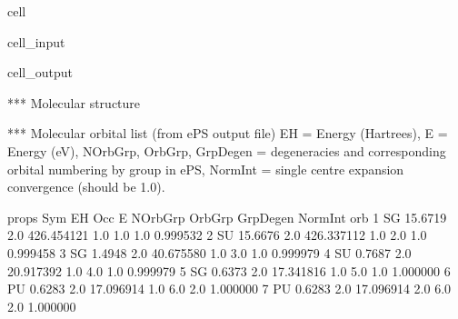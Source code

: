 \documentclass[letterpaper,10pt,english]{jupyterBook}
\begin{document}
\begin{sphinxuseclass}{cell}\begin{sphinxVerbatimInput}

\begin{sphinxuseclass}{cell_input}
\begin{sphinxVerbatim}[commandchars=\\\{\}]
\end{sphinxVerbatim}

\end{sphinxuseclass}\end{sphinxVerbatimInput}
\begin{sphinxVerbatimOutput}

\begin{sphinxuseclass}{cell_output}
\begin{sphinxVerbatim}[commandchars=\\\{\}]
*** Molecular structure
\end{sphinxVerbatim}

\noindent{}

\begin{sphinxVerbatim}[commandchars=\\\{\}]
*** Molecular orbital list (from ePS output file)
EH = Energy (Hartrees), E = Energy (eV), NOrbGrp, OrbGrp, GrpDegen = degeneracies and corresponding orbital numbering by group in ePS, NormInt = single centre expansion convergence (should be \PYGZti{}1.0).
\end{sphinxVerbatim}

\begin{sphinxVerbatim}[commandchars=\\\{\}]
props Sym       EH  Occ           E  NOrbGrp  OrbGrp  GrpDegen   NormInt
orb                                                                     
1      SG \PYGZhy{}15.6719  2.0 \PYGZhy{}426.454121      1.0     1.0       1.0  0.999532
2      SU \PYGZhy{}15.6676  2.0 \PYGZhy{}426.337112      1.0     2.0       1.0  0.999458
3      SG  \PYGZhy{}1.4948  2.0  \PYGZhy{}40.675580      1.0     3.0       1.0  0.999979
4      SU  \PYGZhy{}0.7687  2.0  \PYGZhy{}20.917392      1.0     4.0       1.0  0.999979
5      SG  \PYGZhy{}0.6373  2.0  \PYGZhy{}17.341816      1.0     5.0       1.0  1.000000
6      PU  \PYGZhy{}0.6283  2.0  \PYGZhy{}17.096914      1.0     6.0       2.0  1.000000
7      PU  \PYGZhy{}0.6283  2.0  \PYGZhy{}17.096914      2.0     6.0       2.0  1.000000
\end{sphinxVerbatim}

\end{sphinxuseclass}\end{sphinxVerbatimOutput}

\end{sphinxuseclass}
\end{document}
